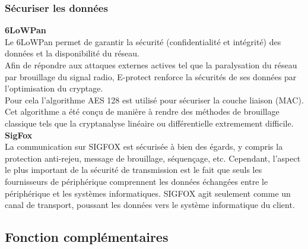 \subsubsection{Sécuriser les données}
\textbf{6LoWPan}\\
Le 6LoWPan permet de garantir la sécurité (confidentialité et intégrité) des données et la disponibilité du réseau. \\
Afin de répondre aux attaques externes actives tel que la paralysation du réseau par brouillage du signal radio, E-protect renforce la sécurités de ses données par l'optimisation du cryptage.\\
Pour cela l'algorithme AES 128 est utilisé pour sécuriser la couche liaison (MAC). Cet algorithme a été conçu de manière à rendre des méthodes de brouillage classique tels que la cryptanalyse linéaire ou différentielle extremement difficile.\cite{www:contiki}\\

\textbf{SigFox}\\
La communication sur SIGFOX est sécurisée à bien des égards, y compris la protection anti-rejeu, message de brouillage, séquençage, etc. Cependant, l'aspect le plus important de la sécurité de transmission est le fait que seuls les fournisseurs de périphérique comprennent les données échangées entre le périphérique et les systèmes informatiques. SIGFOX agit seulement comme un canal de transport, poussant les données vers le système informatique du client.\cite{www:Sigfox}


\subsection{Fonction complémentaires}

